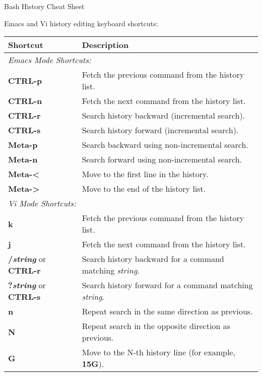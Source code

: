 \documentclass{article}
\begin{document}
\begin{center}
\Large Bash History Cheat Sheet
\end{center}

\vspace{0.4in}

Emacs and Vi history editing keyboard shortcuts:

\renewcommand{\arraystretch}{1.2}
\begin{tabular}{|p{3.5cm}|p{14cm}|}
\hline
\large\textbf{Shortcut} & \large\textbf{Description} \\
\hline
\multicolumn{2}{|l|}{\small\it{Emacs Mode Shortcuts:}} \\
\hline
\textbf{CTRL-p} & Fetch the previous command from the history list. \\
\hline
\textbf{CTRL-n} & Fetch the next command from the history list. \\
\hline
\textbf{CTRL-r} & Search history backward (incremental search). \\
\hline
\textbf{CTRL-s} & Search history forward (incremental search). \\
\hline
\textbf{Meta-p} & Search backward using non-incremental search. \\
\hline
\textbf{Meta-n} & Search forward using non-incremental search. \\
\hline
\textbf{Meta-\textless} & Move to the first line in the history. \\
\hline
\textbf{Meta-\textgreater} & Move to the end of the history list. \\
\hline
\multicolumn{2}{|l|}{\small\it{Vi Mode Shortcuts:}} \\
\hline
\textbf{k} & Fetch the previous command from the history list. \\
\hline
\textbf{j} & Fetch the next command from the history list. \\
\hline
\textbf{/\textit{string}} or \textbf{CTRL-r} & Search history backward for a command matching \textit{string}. \\
\hline
\textbf{?\textit{string}} or \textbf{CTRL-s} & Search history forward for a command matching \textit{string}. \\
\hline
\textbf{n} & Repeat search in the same direction as previous. \\
\hline
\textbf{N} & Repeat search in the opposite direction as previous. \\
\hline
\textbf{G} & Move to the N-th history line (for example, \textbf{15G}). \\
\hline
\end{tabular}
\end{document}
